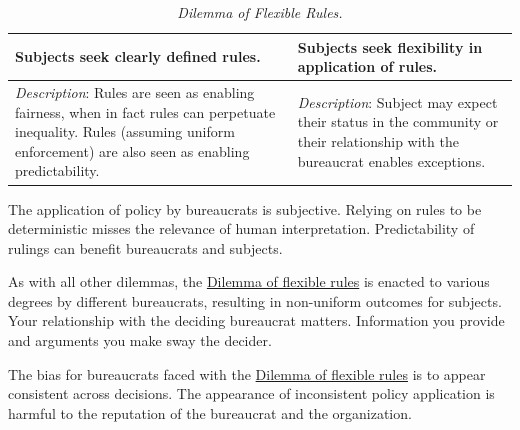 \begin{center}
\begin{table}[H] %
\begin{tabular}{ | m{\dilemmatablewidth}| m{\dilemmatablewidth} | } 
  \hline
  \textbf{Subjects seek clearly defined rules.} &
  \textbf{Subjects seek flexibility in application of rules.} \\
  \hline
  \textit{Description}: Rules are seen as enabling fairness, when in fact rules can perpetuate inequality. Rules (assuming uniform enforcement) are also seen as enabling predictability. & 
  \textit{Description}: Subject may expect their status in the community or their relationship with the bureaucrat enables exceptions. \\
  \hline
\end{tabular}
\caption{\textit{Dilemma of Flexible Rules.}
}
\label{table:dilemma-subject-flexibility}
\end{table}
\end{center}

The application of policy by bureaucrats is subjective. Relying on rules to be deterministic misses the relevance of human interpretation. Predictability of rulings can benefit bureaucrats and subjects.

As with all other dilemmas, the \hyperref[table:dilemma-subject-flexibility]{Dilemma of flexible rules} is enacted to various degrees by different bureaucrats, resulting in non-uniform outcomes for subjects. Your relationship with the deciding bureaucrat matters. Information you provide and arguments you make sway the decider. 

The bias for bureaucrats faced with the \hyperref[table:dilemma-subject-flexibility]{Dilemma of flexible rules} is to appear consistent across decisions. The appearance of inconsistent policy application is harmful to the reputation of the bureaucrat and the organization.

